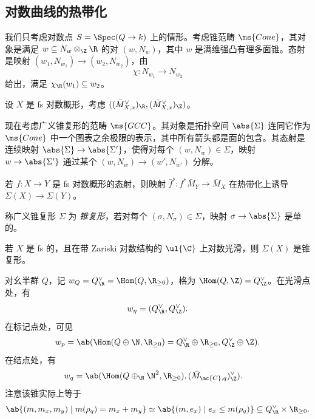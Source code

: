 \subsection{对数曲线的热带化}%
\label{sub:Tropicalization of log curves}

我们只考虑对数点 \(S = \Spec(Q \to k)\) 上的情形。考虑锥范畴 \(\ms{Cone}\)，其对象是满足 \(w \subseteq N_w \otimes_{\Z} \R\) 的对 \((w, N_w)\)，其中 \(w\) 是满维强凸有理多面锥。态射是映射 \((w_1, N_{w_1}) \to (w_2, N_{w_2})\)，由
\[ \chi \colon N_{w_1} \to N_{w_2} \]
给出，满足 \(\chi_{\R}(w_1) \subseteq w_2\)。

\begin{exm}
    设 \(X\) 是 fs 对数概形，考虑 \(( (\bar{M}_{X,x}^{\vee})_{\R}, (\bar{M}_{X,x}^{\vee})_{\Z} )\)。
\end{exm}

现在考虑广义锥复形的范畴 \(\ms{GCC}\)。其对象是拓扑空间 \(\abs{\Sigma}\) 连同它作为 \(\ms{Cone}\) 中一个图表之余极限的表示，其中所有箭头都是面的包含。其态射是连续映射 \(\abs{\Sigma} \to \abs{\Sigma'}\)，使得对每个 \((w, N_w) \in \Sigma\)，映射 \(w \to \abs{\Sigma'}\) 通过某个 \((w, N_w) \to (w', N_{w'})\) 分解。

\begin{exm}
    若 \(f \colon X \to Y\) 是 fs 对数概形的态射，则映射 \(\bar{f}^{\flat} \colon f^* \bar{M}_Y \to \bar{M}_X\) 在热带化上诱导 \(\Sigma(X) \to \Sigma(Y)\)。
\end{exm}

\begin{defn}
    称广义锥复形 \(\Sigma\) 为 \textit{锥复形}，若对每个 \((\sigma, N_{\sigma}) \in \Sigma\)，映射 \(\sigma \to \abs{\Sigma}\) 是单的。
\end{defn}

\begin{thm}
    若 \(X\) 是 fs 的，且在带 Zariski 对数结构的 \(\ul{\C}\) 上对数光滑，则 \(\Sigma(X)\) 是锥复形。
\end{thm}

对幺半群 \(Q\)，记 \(w_Q = Q_{\R}^{\vee} = \Hom(Q, \R_{\geq 0})\)，格为 \(\Hom(Q, \Z) = Q_{\Z}^{\vee}\)。在光滑点处，有
\[ w_{\eta} = (Q_{\R}^{\vee}, Q_{\Z}^{\vee}). \]
在标记点处，可见
\[ w_p = \ab(\Hom (Q \oplus \N, \R_{\geq 0}) = Q_{\R}^{\vee} \oplus \R_{\geq 0}, Q_{\Z}^{\vee}\oplus \Z). \]
在结点处，有
\begin{align*}
    w_q &= \ab(\Hom(Q \oplus_{\N} \N^2, \R_{\geq 0}), ( \bar{M}_{\mc{C}, q} )_{\Z}^{\vee}).
\end{align*}
注意该锥实际上等于
\[ \ab\{(m, m_x, m_y) \mid m(\rho_q) = m_x + m_y \} \simeq \ab\{(m, e_x) \mid e_x \leq m(\rho_q) \} \subseteq Q_{\R}^{\vee} \times \R_{\geq 0}. \]


